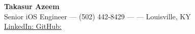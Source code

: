 \begin{center}
    {\fontsize{16}{20}\selectfont \textbf{Takasur Azeem}} \\[0.5em]
    Senior iOS Engineer --- (502) 442-8429 --- \href{mailto:\email}{\email} --- Louisville, KY \\
    \href{https://www.linkedin.com/in/\LinkedIn}{LinkedIn: \LinkedIn} \quad \href{https://github.com/\github}{GitHub: \github}
\end{center}